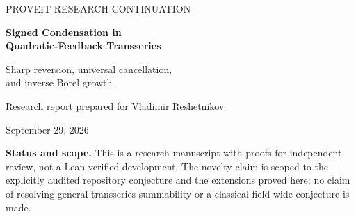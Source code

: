 \documentclass[11pt,a4paper]{article}
\numberwithin{equation}{section}
\theoremstyle{definition}\newtheorem{definition}[theorem]{Definition}
\theoremstyle{remark}\newtheorem{remark}[theorem]{Remark}
\theoremstyle{definition}
\newcommand{\U}{\widehat U}
\newcommand{\Q}{\widehat Q}
\begin{document}
\hypersetup{pageanchor=false}
\begin{titlepage}
\centering
\vspace*{15mm}
{\large PROVEIT RESEARCH CONTINUATION\par}
\vspace{15mm}
{\LARGE\bfseries Signed Condensation in\\[3mm]
Quadratic-Feedback Transseries\par}
\vspace{7mm}
{\Large Sharp reversion, universal cancellation,\\
and inverse Borel growth\par}
\vspace{14mm}
{\large Research report prepared for Vladimir Reshetnikov\par}
\vspace{4mm}
{September 29, 2026\par}
\vspace{15mm}
\begin{minipage}{0.91\textwidth}
\begin{abstract}
For the formal solution of
\(\U(q)=\sum_{j\ge1}w_jq^j\exp(\lambda_j\U(q))\), suppose that
\(w_1=1\), all primitive weights and slopes are nonnegative, and, outside a
finite prefix, \(w_j=1\) and \(\lambda_j=aj^2+bj+d\), with \(a>0\).
We determine a full multiplicative equivalent for the coefficients of its
compositional inverse. With \(\beta=\lambda_1+w_2\),
\(r_n(1+r_n)e^{2r_n}=an\), and
\(S_n=\exp(nr_n(1+2r_n)/(1+r_n))/\sqrt{1+4r_n+2r_n^2}\), the result is
\[
 [u^n]\Q(u)\sim-S_n\exp\!\left(\frac{b-\beta}{a}r_n\right).
\]
For \(w_j=1\) and \(\lambda_j=aj^2\), this proves the precise quadratic
inverse conjecture in the repository's finite-core article. The essential
step is a signed-tail localization theorem: after a sufficiently large but
fixed analytic core is removed, configurations containing at least two
remaining actions contribute less than \(S_n n^{-A}\), for any prescribed
\(A>0\). It is proved at the level of absolute configuration weights,
before cancellations are used. We then derive eventual negativity, a
finite-prefix sensitivity law, the exact positive-axis growth equivalent of
the inverse Borel transform, and the least inverse-term equivalent. The
proofs are self-contained apart from classical inversion and elementary
asymptotic tools.
An exact verification program, recorded integer coefficients, a source
audit, and a research agenda accompany the manuscript.
\end{abstract}
\end{minipage}
\vfill
\begin{minipage}{0.91\textwidth}\small
\textbf{Status and scope.} This is a research manuscript with proofs for
independent review, not a Lean-verified development. The novelty claim is
scoped to the explicitly audited repository conjecture and the extensions
proved here; no claim of resolving general transseries summability or a
classical field-wide conjecture is made.
\end{minipage}
\end{titlepage}
\end{document}
